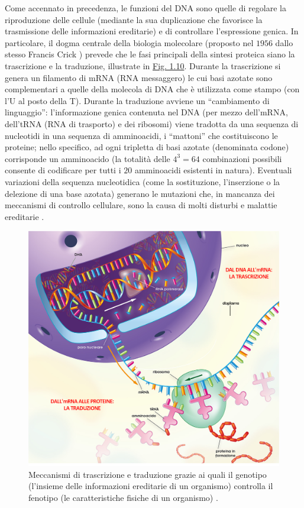 \documentclass[12pt,a4paper,twoside]{report}
\begin{document}
	Come accennato in precedenza, le funzioni del DNA sono quelle di regolare la riproduzione delle cellule (mediante la sua duplicazione che favorisce la trasmissione delle informazioni ereditarie) e di controllare l'espressione genica. In particolare, il dogma centrale della biologia molecolare (proposto nel $1956$ dallo stesso Francis Crick \cite{campbell3anno}) prevede che le fasi principali della sintesi proteica siano la trascrizione e la traduzione, illustrate in \hyperref[fig:dna_rna]{Fig. 1.10}. Durante la trascrizione si genera un filamento di mRNA (RNA messaggero) le cui basi azotate sono complementari a quelle della molecola di DNA che è utilizzata come stampo (con l'U al posto della T). Durante la traduzione avviene un ``cambiamento di linguaggio'': l'informazione genica contenuta nel DNA (per mezzo dell'mRNA, dell'tRNA (RNA di trasporto) e dei ribosomi) viene tradotta da una sequenza di nucleotidi in una sequenza di amminoacidi, i ``mattoni'' che costituiscono le proteine; nello specifico, ad ogni tripletta di basi azotate (denominata codone) corrisponde un amminoacido (la totalità delle $4^3=64$ combinazioni possibili consente di codificare per tutti i $20$ amminoacidi esistenti in natura). Eventuali variazioni della sequenza nucleotidica (come la sostituzione, l'inserzione o la delezione di una base azotata) generano le mutazioni che, in mancanza dei meccanismi di controllo cellulare, sono la causa di molti disturbi e malattie ereditarie \cite{campbell3anno}.
	\begin{figure}[H]
		\centering
		\includegraphics[width=0.85\linewidth]{dna_rna.jpg}
		\caption{Meccanismi di trascrizione e traduzione grazie ai quali il genotipo (l'insieme delle informazioni ereditarie di un organismo) controlla il fenotipo (le caratteristiche fisiche di un organismo) \cite{hub_scuola,campbell3anno}.}
		\label{fig:dna_rna}
	\end{figure}
\end{document}
